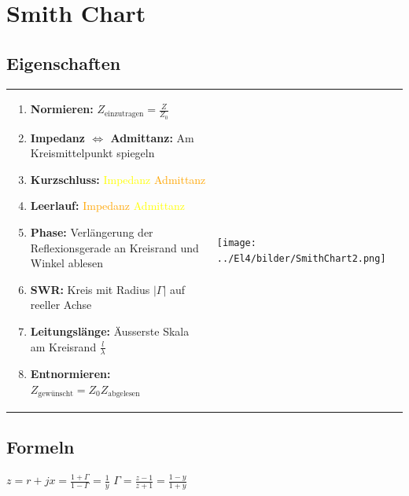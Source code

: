 
\section{Smith Chart}
\subsection{Eigenschaften}
	\begin{tabular}{p{10cm}p{8cm}}
		\begin{minipage}{10cm}
        	\begin{enumerate}{\setlength{\itemsep}{0cm}\setlength{\parsep}{0cm} \setlength{\topsep}{0cm}}
              \item \textbf{Normieren:} $Z_{\text{einzutragen}} = \frac{Z}{Z_0}$
              \item \textbf{Impedanz $\Leftrightarrow$ Admittanz:} Am Kreismittelpunkt spiegeln
              \item \textbf{Kurzschluss:} 	\textcolor{yellow}{Impedanz} \textcolor{orange}{Admittanz}
              \item \textbf{Leerlauf:}		\textcolor{orange}{Impedanz} \textcolor{yellow}{Admittanz}
        	  \item \textbf{Phase:}	Verlängerung der Reflexionsgerade an Kreisrand und Winkel ablesen
        	  \item \textbf{SWR:} Kreis mit Radius $|\Gamma|$ auf reeller Achse
        	  \item \textbf{Leitungslänge:} Äusserste Skala am Kreisrand  $\frac{l}{\lambda}$
        	  \item \textbf{Entnormieren:} $Z_{\text{gewünscht}} = Z_0
        	  Z_{\text{abgelesen}}$
            \end{enumerate}
        \end{minipage} &
		\begin{minipage}{8cm}
        	\texttt{[image: ../El4/bilder/SmithChart2.png]}
        \end{minipage}
	\end{tabular}
\subsection{Formeln}
	$z=r+jx=\frac{1+\Gamma}{1-\Gamma}=\frac{1}{y}$ \qquad
	$\Gamma=\frac{z-1}{z+1}=\frac{1-y}{1+y}$
	
